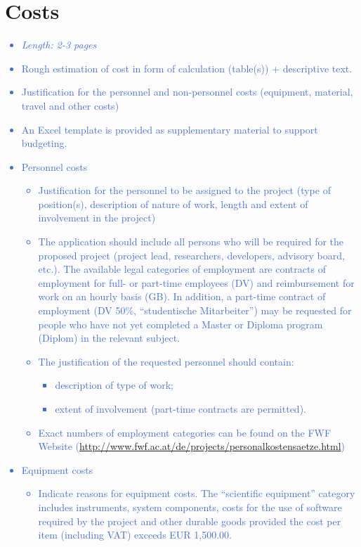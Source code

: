 \documentclass[a4paper,11pt]{article}
\providecommand*{\note}[1]{\small \textcolor{RoyalBlue}{\begin{minipage}{\textwidth}{#1}\end{minipage}}}
\begin{document}
\section{Costs}
\label{sect:costs}

\note{
\begin{itemize}
\item {\em Length: 2-3 pages}
\item Rough estimation of cost in form of calculation (table(s)) + descriptive text.
\item Justification for the personnel and non-personnel costs (equipment, material, travel and other costs)
\item An Excel template is provided as supplementary material to support budgeting.
\item Personnel costs
	\begin{itemize}
	\item     Justification for the personnel to be assigned to the project (type of position(s), description of nature of work, length and extent of involvement in the project)
	\item     The application should include all persons who will be required for the proposed project (project lead, researchers, developers, advisory board, etc.). The available legal categories of employment are contracts of employment for full- or part-time employees (DV) and reimbursement for work on an hourly basis (GB). In addition, a part-time contract of employment (DV 50\%, ``studentische Mitarbeiter'') may be requested for people who have not yet completed a Master or Diploma program (Diplom) in the relevant subject.
	 \item    The justification of the requested personnel should contain:
		\begin{itemize}
		\item 	        description of type of work;
		\item 		        extent of involvement (part-time contracts are permitted).
		\end{itemize}
	\item Exact numbers of employment categories can be found on the FWF Website (\href{http://www.fwf.ac.at/de/projects/personalkostensaetze.html}{http://www.fwf.ac.at/de/projects/personalkostensaetze.html})
	\end{itemize}
\item Equipment costs
	\begin{itemize}
	\item     Indicate reasons for equipment costs. The ``scientific equipment'' category includes instruments, system components, costs for the use of software required by the project and other durable goods provided the cost per item (including VAT) exceeds EUR 1,500.00.

\end{itemize}
\end{itemize}}
\end{document}
